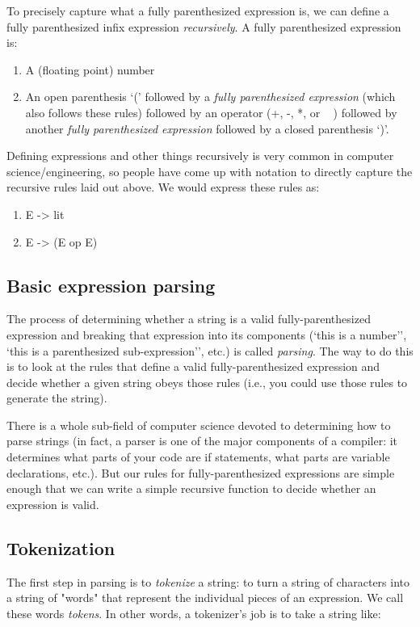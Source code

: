 \documentclass{article}
\begin{document}
To precisely capture what a fully parenthesized expression is, we can define a fully parenthesized infix expression {\em recursively}. A fully parenthesized expression is:

\begin{enumerate}
\item A (floating point) number
\item An open parenthesis `(' followed by a {\em fully parenthesized expression} (which also follows these rules) followed by an operator (\textsf{+, -, *,} or \textsf{ \ } ) followed by another {\em fully parenthesized expression} followed by a closed parenthesis `)'.
\end{enumerate}

Defining expressions and other things recursively is very common in computer science/engineering, so people have come up with notation to directly capture the recursive rules laid out above. We would express these rules as:

\begin{enumerate}
\item        \textsf{E -> lit}
\item        \textsf{E -> (E op E)}
\end{enumerate}

\subsection{Basic expression parsing}

The process of determining whether a string is a valid fully-parenthesized expression and breaking that expression into its components (`this is a number'', `this is a parenthesized sub-expression'', etc.) is called {\em parsing}. The way to do this is to look at the rules that define a valid fully-parenthesized expression and decide whether a given string obeys those rules (i.e., you could use those rules to generate the string).


There is a whole sub-field of computer science devoted to determining how to parse strings (in fact, a parser is one of the major components of a compiler: it determines what parts of your code are if statements, what parts are variable declarations, etc.). But our rules for fully-parenthesized expressions are simple enough that we can write a simple recursive function to decide whether an expression is valid.

\subsection{Tokenization}
The first step in parsing is to {\em tokenize} a string: to turn a string of characters into a string of "words" that represent the individual pieces of an expression. We call these words {\em tokens}. In other words, a tokenizer's job is to take a string like:
\end{document}
